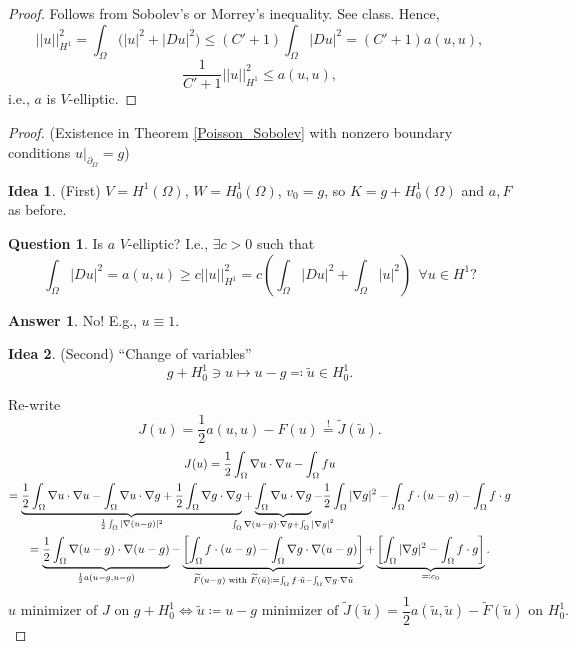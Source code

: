 \documentclass[12pt]{article}
\theoremstyle{definition}
\newtheorem*{idea}{Idea}
\newtheorem*{question}{Question}
\newtheorem*{answer}{Answer}
\begin{document}
\begin{proof}
Follows from Sobolev's or Morrey's inequality. See class. Hence,
\[||u||_{H^1}^2=\int_{\Omega}\big(|u|^2+|Du|^2\big)\leq(C'+1)\int_{\Omega}|Du|^2=(C'+1)a(u,u),\]
\[\frac{1}{C'+1}||u||_{H^1}^2\leq a(u,u),\]
i.e., $a$ is $V$-elliptic.
\end{proof}

\begin{proof}
(Existence in Theorem \ref{Poisson_Sobolev} with nonzero boundary conditions $u|_{\partial_{\Omega}}=g$)

\begin{idea}
(First) $V=H^1(\Omega)$, $W=H_0^1(\Omega)$, $v_0=g$, so $K=g+H_0^1(\Omega)$ and $a,F$ as before.
\end{idea}

\begin{question}
Is $a$ $V$-elliptic? I.e., $\exists c>0$ such that
\[\int_{\Omega}|Du|^2=a(u,u)\geq c||u||_{H^1}^2=c\left(\int_{\Omega}|Du|^2+\int_{\Omega}|u|^2\right)\ \ \forall u\in H^1\text{?}\]
\end{question}

\begin{answer}
No! E.g., $u\equiv1$.
\end{answer}

\begin{idea}
(Second) ``Change of variables''
\[g+H_0^1\ni u\longmapsto u-g\eqqcolon\tilde{u}\in H_0^1.\]
\end{idea}

Re-write
\[J(u)=\frac{1}{2}a(u,u)-F(u)\overset{!}{=}\widetilde{J}(\tilde{u}).\]
\begin{multline*}
J(u)=\frac{1}{2}\int_{\Omega}\nabla u\cdot\nabla u-\int_{\Omega}fu\\
=\underbrace{\frac{1}{2}\int_{\Omega}\nabla u\cdot\nabla u-\int_{\Omega}\nabla u\cdot\nabla g+\frac{1}{2}\int_{\Omega}\nabla g\cdot\nabla g}_{\frac{1}{2}\int_{\Omega}|\nabla(u-g)|^2}+\underbrace{\int_{\Omega}\nabla u\cdot\nabla g}_{\mathclap{\int_{\Omega}\nabla(u-g)\cdot\nabla g+\int_{\Omega}|\nabla g|^2}}-\frac{1}{2}\int_{\Omega}|\nabla g|^2-\int_{\Omega}f\cdot(u-g)-\int_{\Omega}f\cdot g\\
=\underbrace{\frac{1}{2}\int_{\Omega}\nabla(u-g)\cdot\nabla(u-g)}_{\frac{1}{2}a(u-g,u-g)}-\underbrace{\left[\int_{\Omega}f\cdot(u-g)-\int_{\Omega}\nabla g\cdot\nabla(u-g)\right]}_{\widetilde{F}(u-g)\text{ with }\widetilde{F}(\tilde{u})\coloneqq\int_{\Omega}f\cdot\tilde{u}-\int_{\Omega}\nabla g\cdot\nabla\tilde{u}}+\underbrace{\left[\int_{\Omega}|\nabla g|^2-\int_{\Omega}f\cdot g\right]}_{\eqqcolon c_0}.
\end{multline*}
\[u\text{ minimizer of }J\text{ on }g+H_0^1\Longleftrightarrow\tilde{u}\coloneqq u-g\text{ minimizer of }\widetilde{J}(\tilde{u})=\frac{1}{2}a(\tilde{u},\tilde{u})-\widetilde{F}(\tilde{u})\text{ on }H_0^1.\]


\end{proof}
\end{document}
